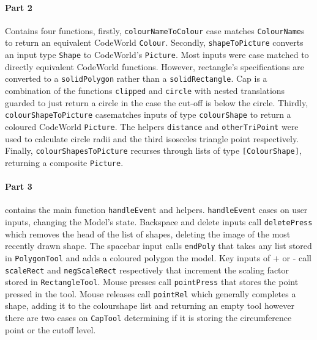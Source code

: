 \documentclass[11pt]{article}
\begin{document}
\paragraph{Part 2} Contains four functions, firstly, \verb|colourNameToColour|  case matches \verb|ColourName|s to return an equivalent CodeWorld  \verb|Colour|. Secondly, \verb|shapeToPicture| converts an input type \verb|Shape| to CodeWorld's  \verb|Picture|. Most inputs were case matched to directly equivalent CodeWorld functions. However, rectangle's specifications are converted to a \verb|solidPolygon| rather than a \verb|solidRectangle|.  Cap is a combination of the functions \verb|clipped| and \verb|circle| with nested translations guarded to just return a circle in the case the cut-off is below the circle. Thirdly, \verb|colourShapeToPicture| casematches inputs of type \verb|colourShape| to return a coloured CodeWorld  \verb|Picture|. The helpers \verb|distance| and \verb|otherTriPoint| were used to calculate circle radii and the third isosceles triangle point respectively. Finally, \verb|colourShapesToPicture| recurses through lists of type \verb|[ColourShape]|, returning a composite \verb|Picture|.

\paragraph{Part 3} contains the main function  \verb|handleEvent| and helpers. \verb|handleEvent| cases on user inputs, changing the Model's state. Backspace and delete inputs call \verb|deletePress| which removes the head of the list of shapes, deleting the image of the most recently drawn shape. The spacebar input calls  \verb|endPoly| that takes any list stored in  \verb|PolygonTool| and adds a coloured polygon the model. Key inputs of + or - call \verb|scaleRect| and \verb|negScaleRect| respectively that increment the scaling factor stored in \verb|RectangleTool|. Mouse presses call \verb|pointPress| that stores the point pressed in the tool. Mouse releases call \verb|pointRel| which generally completes a shape, adding it to the colourshape list and returning an empty tool however there are two cases on \verb|CapTool| determining if it is storing the circumference point or the cutoff level.
\end{document}
